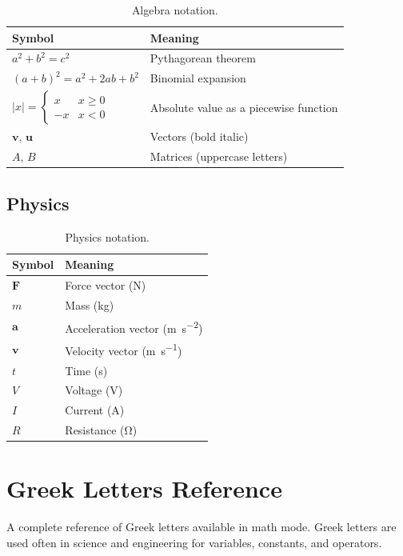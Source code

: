 \begin{table}[H]
	\centering
	\caption{Algebra notation.}
	\label{tab:notation-algebra}
	\begin{tabularx}{\linewidth}{@{}lX@{}}
		\toprule
		Symbol & Meaning \\
		\midrule
		$a^2 + b^2 = c^2$           & Pythagorean theorem \\
		$(a + b)^2 = a^2 + 2ab + b^2$ & Binomial expansion \\
		$|x| = \begin{cases} x & x \geq 0 \\ -x & x < 0 \end{cases}$ & Absolute value as a piecewise function \\
		$\bm{v}$, $\bm{u}$          & Vectors (bold italic) \\
		$A$, $B$                    & Matrices (uppercase letters) \\
		\bottomrule
	\end{tabularx}
\end{table}

\subsection{Physics}

\begin{table}[H]
	\centering
	\caption{Physics notation.}
	\label{tab:notation-physics}
	\begin{tabularx}{\linewidth}{@{}lX@{}}
		\toprule
		Symbol & Meaning \\
		\midrule
		$\bm{F}$    & Force vector (\si{\newton}) \\
		$m$         & Mass (\si{\kilo\gram}) \\
		$\bm{a}$    & Acceleration vector (\si{\metre\per\second\squared}) \\
		$\bm{v}$    & Velocity vector (\si{\metre\per\second}) \\
		$t$         & Time (\si{\second}) \\
		$V$         & Voltage (\si{\volt}) \\
		$I$         & Current (\si{\ampere}) \\
		$R$         & Resistance (\si{\ohm}) \\
		\bottomrule
	\end{tabularx}
\end{table}

\newpage
\section{Greek Letters Reference}
A complete reference of Greek letters available in math mode. Greek letters are used often in science and engineering for variables, constants, and operators.

